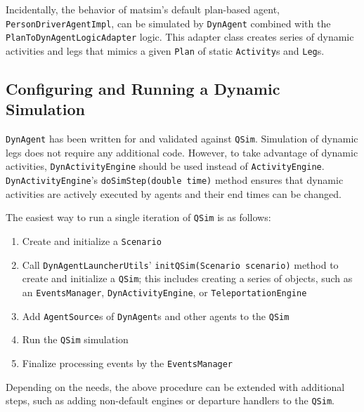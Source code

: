 Incidentally, the behavior of \gls{matsim}'s default plan-based agent, \lstinline$PersonDriverAgentImpl$, can be simulated by \lstinline$DynAgent$ combined with the \lstinline$PlanToDynAgentLogicAdapter$ logic. This adapter class creates series of dynamic activities and legs that mimics a given \lstinline$Plan$ of static \lstinline$Activity$s and \lstinline$Leg$s.

\subsection{Configuring and Running a Dynamic Simulation}
\label{sec:config-dyn-sim}
\lstinline$DynAgent$ has been written for and validated against \lstinline$QSim$. Simulation of dynamic legs does not require any additional code. However, to take advantage of dynamic activities,  \lstinline$DynActivityEngine$ should be used instead of \lstinline$ActivityEngine$. \lstinline$DynActivityEngine$'s \lstinline$doSimStep(double time)$ method ensures that dynamic activities are actively executed by agents and their end times can be changed.

The easiest way to run a single iteration of \lstinline$QSim$ is as follows:
%
\begin{enumerate}
	\item Create and initialize a \lstinline$Scenario$

	\item Call \lstinline$DynAgentLauncherUtils$' \lstinline$initQSim(Scenario scenario)$ method to create and initialize a \lstinline$QSim$; this includes creating a series of objects, such as an \lstinline$EventsManager$, \lstinline$DynActivityEngine$, or \lstinline$TeleportationEngine$

	\item Add \lstinline$AgentSource$s of \lstinline$DynAgent$s and other agents to the \lstinline$QSim$
	
	\item Run the \lstinline$QSim$ simulation
	
	\item Finalize processing events by the \lstinline$EventsManager$
	
\end{enumerate}
%
Depending on the needs, the above procedure can be extended with additional steps, such as adding non-default engines or departure handlers to the \lstinline$QSim$.

